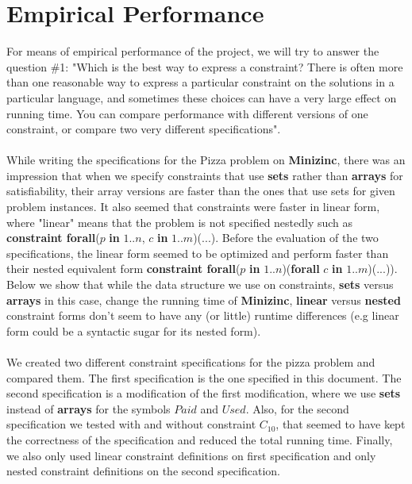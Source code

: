 \documentclass[conference]{IEEEtran}
\newcommand\tab[1][0.3cm]{\hspace*{#1}}
\begin{document}
\section{Empirical Performance}
For means of empirical performance of the project, we will try to answer the question \#1: "Which is the best way to express a constraint? There is often more than one reasonable way to express a particular constraint on the solutions in a particular language, and sometimes these choices can have a very large effect on running time. You can compare performance with different versions of one constraint, or compare two very different specifications".
\\
\\
\tab While writing the specifications for the Pizza problem on \textbf{Minizinc}, there was an impression that when we specify constraints that use \textbf{sets} rather than \textbf{arrays} for satisfiability, their array versions are faster than the ones that use sets for given problem instances. It also seemed that constraints were faster in linear form, where "linear" means that the problem is not specified nestedly such as \textbf{constraint forall}($p$ \textbf{in} $1..n$, $c$ \textbf{in} $1..m$)($...$). Before the evaluation of the two specifications, the linear form seemed to be optimized and perform faster than their nested equivalent form \textbf{constraint forall}($p$ \textbf{in} $1..n$)(\textbf{forall} $c$ \textbf{in} $1..m$)($...$)). Below we show that while the data structure we use on constraints, \textbf{sets} versus \textbf{arrays} in this case, change the running time of \textbf{Minizinc}, \textbf{linear} versus \textbf{nested} constraint forms don't seem to have any (or little) runtime differences (e.g linear form could be a syntactic sugar for its nested form).
\\
\\
\tab We created two different constraint specifications for the pizza problem and compared them. The first specification is the one specified in this document. The second specification is a modification of the first modification, where we use \textbf{sets} instead of \textbf{arrays} for the symbols $Paid$ and $Used$. Also, for the second specification we tested with and without constraint $C_{10}$, that seemed to have kept the correctness of the specification and reduced the total running time. Finally, we also only used linear constraint definitions on first specification and only nested constraint definitions on the second specification.
\\
\end{document}
